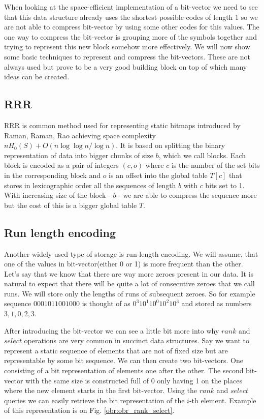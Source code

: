 When looking at the space-efficient implementation of a bit-vector we need to see that this data structure already uses the shortest possible codes of length 1 so we are not able to compress bit-vector by using some other codes for this values. The one way to compress the bit-vector is grouping more of the symbols together and trying to represent this new block somehow more effectively. We will now show some basic techniques to represent and compress the bit-vectors. These are not always used but prove to be a very good building block on top of which many ideas can be created.

\subsection{RRR}

RRR is common method used for representing static bitmaps introduced by Raman, Raman, Rao \cite{raman2007succinct} achieving space complexity $nH_0(S) + O(n \log \log n / \log n)$. It is based on splitting the binary representation of data into bigger chunks of size $b$, which we call blocks.
Each block is encoded as a pair of integers $(c, o)$ where $c$ is the number of the set bits in the corresponding block and $o$ is an offset into the global table $T[c]$ that stores in lexicographic order all the sequences of
length $b$ with $c$ bits set to 1. With increasing size of the block - $b$ - we are able to compress the sequence more but the cost of this is a bigger global table $T$.

\subsection{Run length encoding}

Another widely used type of storage is run-length encoding. We will assume, that one of the values in bit-vector(either 0 or 1) is more frequent than the other. Let's say that we know that there are way more zeroes present in our data. It is natural to expect that there will be quite a lot of consecutive zeroes that we call runs. We will store only the lengths of runs of subsequent zeroes. So for example
sequence $0001011001000$ is thought of as $0^{3}10^{1}10^{0}10^{2}10^{3}$ and stored as numbers $3, 1, 0, 2, 3$.

After introducing the bit-vector we can see a little bit more into why $rank$ and $select$ operations are very common in succinct data structures. Say we want to represent a static sequence of elements that are not of fixed size but are representable by some bit sequence.
We can then create two bit-vectors. One consisting of a bit representation of elements one after the other.
The second bit-vector with the same size is constructed full of 0 only having 1 on the places where the new element starts in the first bit-vector.
Using the $rank$ and $select$ queries we can easily retrieve the bit representation of the $i$-th element.
Example of this representation is on Fig. \ref{obr:obr_rank_select}.

